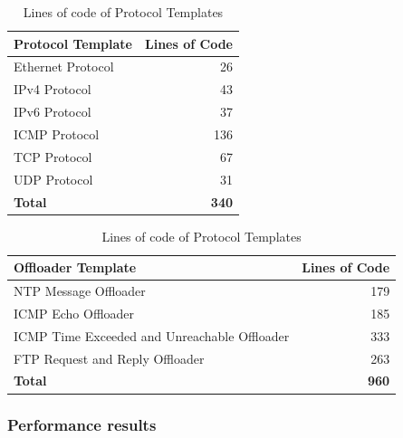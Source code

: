 \begin{table}[htb]
    \caption{Lines of code of Protocol Templates}
    \begin{center}
        \begin{tabular}{|l|r|}
            \hline
            Protocol Template & Lines of Code \\ \hline
            Ethernet Protocol & 26           \\ \hline
            IPv4 Protocol     & 43           \\ \hline
            IPv6 Protocol     & 37           \\ \hline
            ICMP Protocol     & 136          \\ \hline
            TCP Protocol      & 67           \\ \hline
            UDP Protocol      & 31           \\ \hline
            \textbf{Total}    & \textbf{340} \\ \hline
        \end{tabular}%
    \end{center}
    \label{table:lines_by_protocol_template}
\end{table}

\begin{table}[htb]
    \caption{Lines of code of Protocol Templates}
    \begin{center}
        \begin{tabular}{|l|r|}
            \hline
            Offloader Template                           & Lines of Code \\ \hline
            NTP Message Offloader                        & 179 \\ \hline
            ICMP Echo Offloader                          & 185 \\ \hline
            ICMP Time Exceeded and Unreachable Offloader & 333 \\ \hline
            FTP Request and Reply Offloader              & 263 \\ \hline
            \textbf{Total}                               & \textbf{960} \\ \hline
        \end{tabular}%
    \end{center}
    \label{table:lines_by_offloader_template}
\end{table}

\subsubsection*{Performance results}

